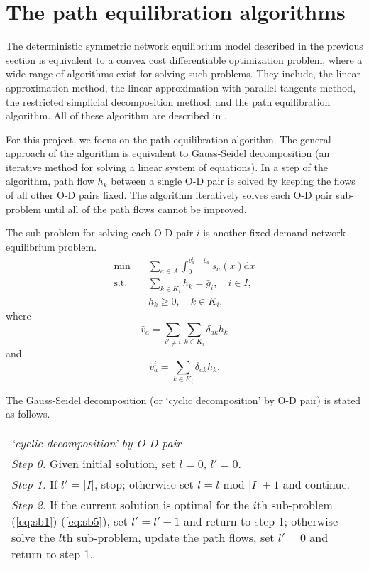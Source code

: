 \section{The path equilibration algorithms}
The deterministic symmetric network equilibrium model described in the previous section is equivalent to a convex cost differentiable optimization problem,
where a wide range of algorithms exist for solving such problems.
They include, the linear approximation method,
the linear approximation with parallel tangents method,
the restricted simplicial decomposition method,
and the path equilibration algorithm.
All of these algorithm are described in \citet{Florian}.

For this project,
we focus on the path equilibration algorithm.
The general approach of the algorithm is equivalent to
Gauss-Seidel decomposition (an iterative method for solving a linear system of equations).
In a step of the algorithm,
path flow $h_k$ between a single O-D pair is solved by keeping the flows of all other O-D pairs fixed.
The algorithm iteratively solves each O-D pair sub-problem until all of the path flows cannot be improved.

The sub-problem for solving each O-D pair $i$ is another fixed-demand network equilibrium problem.
\begin{align} \label{eq:sb1}
    \min & \quad \sum_{a \in A} \int_0^{v_a^i + \bar{v}_a} s_a(x) \mathrm{d} x \\
    \text{s.t.} &\quad \sum_{k \in K_i} h_k = \bar{g}_i, \quad i \in I, \\
    & \quad h_k \geq 0, \quad k \in K_i,
\end{align}
where 
\begin{equation}
    \bar{v}_a = \sum_{i' \neq i} \sum_{k \in K_i} \delta_{ak} h_k
\end{equation}
and
\begin{equation} \label{eq:sb5}
    v_a^i = \sum_{k \in K_i} \delta_{ak} h_k.
\end{equation}

The Gauss-Seidel decomposition (or `cyclic decomposition' by O-D pair) is stated as follows.

\begin{table}[H]
    \begin{tabular}{ m{} }
        \hspace{-.5cm}\emph{`cyclic decomposition' by O-D pair} \\
        \emph{Step 0.} Given initial solution, set $l = 0$, $l' = 0$.\\
        \emph{Step 1.} If $l' = |I|$, stop; otherwise set $l = l \text{ mod } |I| + 1$ and continue.\\
        \emph{Step 2.} If the current solution is optimal for the $i$th sub-problem (\ref{eq:sb1})-(\ref{eq:sb5}), set $l' = l' + 1$ and return to step 1; otherwise solve the $l$th sub-problem, update the path flows, set $l' = 0$ and return to step 1.\\
    \end{tabular}
\end{table}

